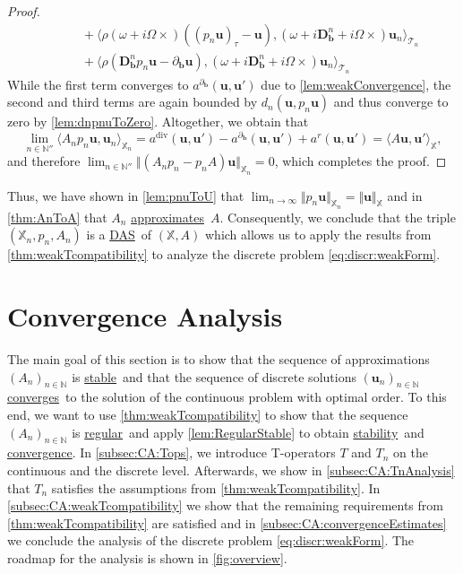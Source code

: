 \documentclass{m2an}
\newcommand{\inner}[1]{\langle #1 \rangle}
\newcommand{\bflow}{\mathbf{b}}
\newcommand{\angvel}{\Omega}
\newcommand{\dopd}{(\omega+i\ddiffb+i\angvel\times)}
\renewcommand{\u}{\mathbf{u}}
\renewcommand{\div}{\operatorname{div}}
\newcommand{\calT}{\mathcal{T}}
\newcommand{\X}{\mathbb{X}}
\newcommand{\Xn}{\mathbb{X}_n}
\newcommand{\bD}{\mathbf{D}}
\newcommand{\Tn}{\calT_n}
\newcommand{\N}{\mathbb{N}}
\newcommand{\seq}[1]{(#1_n)_{n \in \mathbb{N}}}
\newcommand{\diffb}{\partial_{\bflow}}
\newcommand{\ddiffb}{\bD_{\bflow}^n}
\newcommand{\PVol}[1]{(#1)_{\tau}}
\newcommand{\adiv}{a^{\div}}
\newcommand{\aconv}{a^{\diffb}}
\newcommand{\arem}{a^{r}}
\newcommand\converges{\hyperlink{converge}{converges}}
\newcommand\convergence{\hyperlink{converge}{convergence}}
\newcommand\stable{\hyperlink{stable}{stable}}
\newcommand\stability{\hyperlink{stable}{stability}}
\newcommand\regular{\hyperlink{regular}{regular}}
\newcommand\approximates{\hyperlink{approximate}{approximates}}
\newcommand{\DAS}{\hyperlink{DAS}{DAS}}
\theoremstyle{plain}
\theoremstyle{definition}
\begin{document}
\begin{proof}
\begin{align*}
      &\qquad + \inner{\rho(\omega + i\Omega \times)(\PVol{p_n \u} - \u), \dopd \u_n}_{\Tn} \\
      &\qquad + \inner{\rho(\ddiffb p_n \u - \diffb \u), \dopd \u_n}_{\Tn}
   \end{align*}
   While the first term converges to $\aconv(\u,\u')$ due to \cref{lem:weakConvergence}, the second and third terms are again bounded by $d_n(\u,p_n \u)$ and thus converge to zero by \cref{lem:dnpnuToZero}. 
   Altogether, we obtain that 
   \begin{equation*}
      \lim_{n \in \N''} \inner{A_n p_n \u,\u_n}_{\Xn} = \adiv(\u,\u') - \aconv(\u,\u') + \arem(\u,\u') = \inner{A \u, \u'}_{\X},
   \end{equation*}
   and therefore $\lim_{n \in \N''} \Vert (A_n p_n - p_n A ) \u \Vert_{\Xn} = 0$, which completes the proof.
\end{proof}

Thus, we have shown in \cref{lem:pnuToU} that $\lim_{n \to \infty} \Vert p_n \u \Vert_{\Xn} = \Vert \u \Vert_{\X}$ and in \cref{thm:AnToA} that $A_n$ \approximates~$A$. Consequently, we conclude that the triple $(\Xn,p_n,A_n)$ is a \DAS~of $(\X,A)$ which allows us to apply the results from \cref{thm:weakTcompatibility} to analyze the discrete problem \eqref{eq:discr:weakForm}.

\section{Convergence Analysis}\label{sec:convergenceAnalysis}
The main goal of this section is to show that the sequence of approximations $\seq{A}$ is \stable~and that the sequence of discrete solutions $\seq{\u}$ \converges~to the solution of the continuous problem with optimal order. To this end, we want to use \cref{thm:weakTcompatibility} to show that the sequence $\seq{A}$ is \regular~and apply \cref{lem:RegularStable} to obtain \stability~and \convergence. In \cref{subsec:CA:Tops}, we introduce T-operators $T$ and $T_n$ on the continuous and the discrete level. Afterwards, we show in \cref{subsec:CA:TnAnalysis} that $T_n$ satisfies the assumptions from \cref{thm:weakTcompatibility}. In \cref{subsec:CA:weakTcompatibility} we show that the remaining requirements from \cref{thm:weakTcompatibility} are satisfied and in \cref{subsec:CA:convergenceEstimates} we conclude the analysis of the discrete problem \eqref{eq:discr:weakForm}. The roadmap for the analysis is shown in \cref{fig:overview}.
\end{document}
